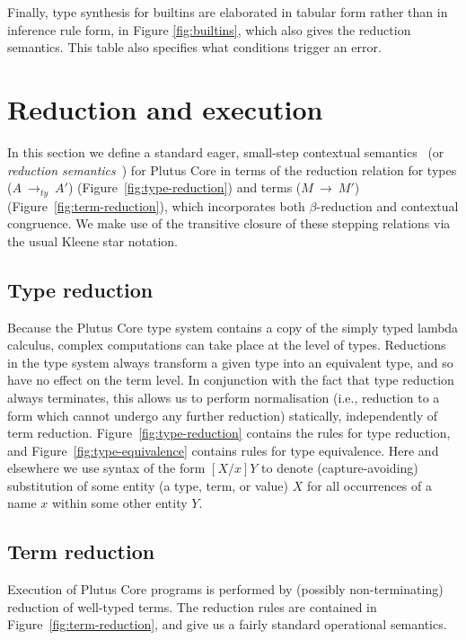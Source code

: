 \documentclass[a4paper]{article}
\newcommand{\typeStep}[2]{#1 ~ \rightarrow_{ty} ~ #2}
\newcommand{\step}[2]{#1 ~ \rightarrow ~ #2}
\begin{document}
\noindent Finally, type synthesis for builtins are elaborated in tabular form
rather than in inference rule form, in Figure
\ref{fig:builtins}, which also gives the reduction
semantics. This table also specifies what conditions trigger an error.


\section{Reduction and execution}
\label{sec:reduction}

In this section we define a standard eager,
small-step contextual semantics~\citep[5.3]{Harper:PFPL} (or
\textit{reduction semantics}~\citep[\S2]{Felleisen-Hieb}) for Plutus
Core in terms of the reduction relation for types
(\(\typeStep{A}{A'}\)) (Figure~\ref{fig:type-reduction})
and terms (\(\step{M}{M'}\)) (Figure~\ref{fig:term-reduction}), which
incorporates both $\beta$-reduction and contextual congruence. We make
use of the transitive closure of these stepping relations via the
usual Kleene star notation.


\subsection{Type reduction}
Because the Plutus Core type system contains a copy of the simply
typed lambda calculus, complex computations can take place at the
level of types.  Reductions in the type system always transform a
given type into an equivalent type, and so have no effect on the term
level.  In conjunction with the fact that type reduction always
terminates, this allows us to perform normalisation (i.e., reduction
to a form which cannot undergo any further reduction) statically,
independently of term reduction.  Figure~\ref{fig:type-reduction}
contains the rules for type reduction, and
Figure~\ref{fig:type-equivalence} contains rules for type equivalence.
Here and elsewhere we use syntax of the form $[X/x]Y$ to denote
(capture-avoiding) substitution of some entity (a type, term, or
value) $X$ for all occurrences of a name $x$ within some other entity
$Y$.




\newpage
\subsection{Term reduction}
Execution of Plutus Core programs is performed by (possibly
non-terminating) reduction of well-typed terms.  The reduction rules
are contained in Figure~\ref{fig:term-reduction}, and give us a fairly
standard operational semantics.
\end{document}
